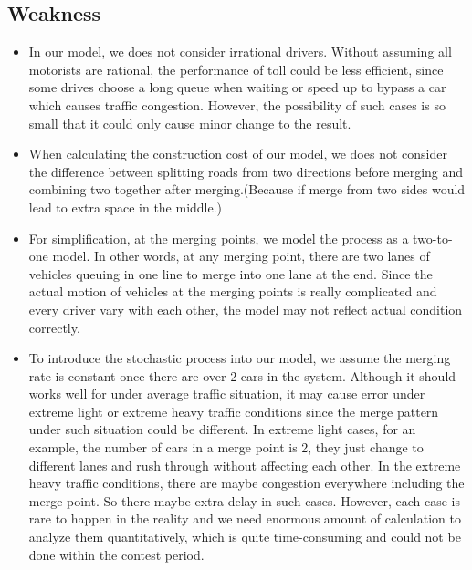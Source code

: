 \subsection{Weakness}
\begin{itemize}
\item In our model, we does not consider irrational drivers. Without assuming all motorists are rational, the performance of toll could be less efficient, since some drives choose a long queue when waiting or speed up to bypass a car which causes traffic congestion. However, the possibility of such cases is so small that it could only cause minor change to the result.
\item When calculating the construction cost of our model, we does not consider the difference between splitting roads from two directions before merging and combining two together after merging.(Because if merge from two sides would lead to extra space in the middle.)
\item For simplification, at the merging points, we model the process as a two-to-one model. In other words, at any merging point, there are two lanes of vehicles queuing in one line to merge into one lane at the end. Since the actual motion of vehicles at the merging points is really complicated and every driver vary with each other, the model may not reflect actual condition correctly.
\item To introduce the stochastic process into our model, we assume the merging rate is constant once there are over 2 cars in the system. Although it should works well for under average traffic situation, it may cause error under extreme light or extreme heavy traffic conditions since the merge pattern under such situation could be different. In extreme light cases, for an example, the number of cars in a merge point is 2, they just change to different lanes and rush through without affecting each other. In the extreme heavy traffic conditions, there are maybe congestion everywhere including the merge point. So there maybe extra delay in such cases. However, each case is rare to happen in the reality and we need enormous amount of calculation to analyze them quantitatively, which is quite time-consuming and could not be done within the contest period.
\end{itemize}

